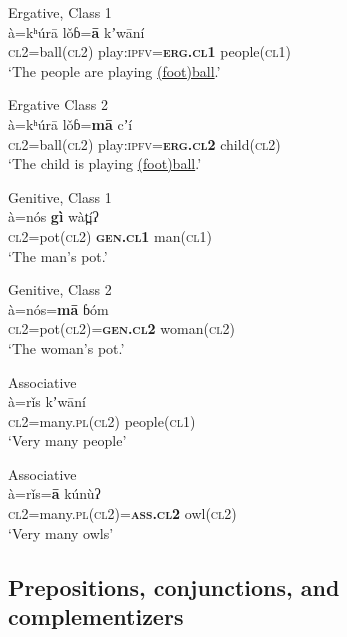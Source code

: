 \documentclass[output=collectionpaper,hidelinks]{langscibook}
\theoremstyle{remark}
\begin{document}
\ea
 Ergative, Class 1 \\
\gll à=kʰúrā lǒɓ=\textbf{ā} kʼwāní \\
 \textsc{cl2}=ball(\textsc{cl2}) play:\textsc{ipfv}=\textbf{\textsc{erg.cl1}} people(\textsc{cl1}) \\
\glt `The people are playing \uline{(foot)ball}.' \\
\z

\ea
 Ergative Class 2 \\
\gll à=kʰúrā lǒɓ=\textbf{mā} cʼí \\
 \textsc{cl2}=ball(\textsc{cl2}) play:\textsc{ipfv}=\textbf{\textsc{erg.cl2}} child(\textsc{cl2}) \\
\glt `The child is playing \uline{(foot)ball}.' \\
\z

\ea
 Genitive, Class 1 \\
\gll à=nós \textbf{gì} wàt̪íʔ \\
 \textsc{cl2}=pot(\textsc{cl2}) \textbf{\textsc{gen.cl1}} man(\textsc{cl1}) \\
\glt `The man's pot.' \\
\z

\ea
 Genitive, Class 2 \\
\gll à=nós=\textbf{mā} ɓóm \\
 \textsc{cl2}=pot(\textsc{cl2})=\textbf{\textsc{gen.cl2}} woman(\textsc{cl2}) \\
\glt `The woman's pot.' \\
\z

\ea
 Associative \\
\gll à=rǐs kʼwāní \\
 \textsc{cl2}=many.\textsc{pl}(\textsc{cl2}) people(\textsc{cl1}) \\
\glt `Very many people' \\
\z

\ea
 Associative \\
\gll à=rǐs=\textbf{ā} kúnùʔ \\
 \textsc{cl2}=many.\textsc{pl}(\textsc{cl2})=\textbf{\textsc{ass.cl2}} owl(\textsc{cl2}) \\
\glt `Very many owls' \\
\z


\subsection{Prepositions, conjunctions, and complementizers}
\label{sec:Don:Prepositions_Conjunctions_Complementizers}
\end{document}
